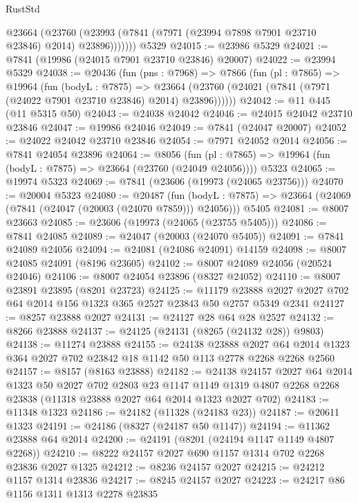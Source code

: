 \begin{lexlean}{RustStd}
\begin{coremodule}
{\begin{coremodule}
{{{{{{{{{{{{{{{{{{{{{{{{{{{{{{{{{{{{{{{{{{{{{{{{{{{{{{          @23664
            (@23760 (@23993 (@7841 (@7971 (@23994 @7898 @7901 @23710 @23846) @2014) @23896)))))))
    @5329
@24015 := @23986 @5329
@24021 := @7841 (@19986 (@24015 @7901 @23710 @23846) @20007)
@24022 := @23994 @5329
@24038 := @20436
    (fun (pns : @7968) =>
    @7866
      (fun (pl : @7865) =>
      @19964
        (fun (bodyL : @7875) =>
        @23664 (@23760 (@24021 (@7841 (@7971 (@24022 @7901 @23710 @23846) @2014) @23896))))))
@24042 := @11 @445 (@11 @5315 @50)
@24043 := @24038 @24042
@24046 := @24015 @24042 @23710 @23846
@24047 := @19986 @24046
@24049 := @7841 (@24047 @20007)
@24052 := @24022 @24042 @23710 @23846
@24054 := @7971 @24052 @2014
@24056 := @7841 @24054 @23896
@24064 := @8056
    (fun (pl : @7865) => @19964 (fun (bodyL : @7875) => @23664 (@23760 (@24049 @24056))))
    @5323
@24065 := @19974 @5323
@24069 := @7841 (@23606 (@19973 (@24065 @23756)))
@24070 := @20004 @5323
@24080 := @20487
    (fun (bodyL : @7875) => @23664 (@24069 (@7841 (@24047 (@20003 (@24070 @7859))) @24056)))
    @5405
@24081 := @8007 @23663
@24085 := @23606 (@19973 (@24065 (@23755 @5405)))
@24086 := @7841 @24085
@24089 := @24047 (@20003 (@24070 @5405))
@24091 := @7841 @24089 @24056
@24094 := @24081 (@24086 @24091) @14159
@24098 := @8007 @24085 @24091 (@8196 @23605)
@24102 := @8007 @24089 @24056 (@20524 @24046)
@24106 := @8007 @24054 @23896 (@8327 @24052)
@24110 := @8007 @23891 @23895 (@8201 @23723)
@24125 := @11179
    @23888
    @2027
    @2027
    @702
    @64
    @2014
    @156
    @1323
    @365
    @2527
    @23843
    @50
    @2757
    @5349
    @2341
@24127 := @8257 @23888 @2027
@24131 := @24127 @28 @64 @28 @2527
@24132 := @8266 @23888
@24137 := @24125 (@24131 (@8265 (@24132 @28)) @9803)
@24138 := @11274 @23888
@24155 := @24138
    @23888
    @2027
    @64
    @2014
    @1323
    @364
    @2027
    @702
    @23842
    @18
    @1142
    @50
    @113
    @2778
    @2268
    @2268
    @2560
@24157 := @8157 (@8163 @23888)
@24182 := @24138
    @24157
    @2027
    @64
    @2014
    @1323
    @50
    @2027
    @702
    @2803
    @23
    @1147
    @1149
    @1319
    @4807
    @2268
    @2268
    @23838
    (@11318 @23888 @2027 @64 @2014 @1323 @2027 @702)
@24183 := @11348 @1323
@24186 := @24182 (@11328 (@24183 @23))
@24187 := @20611 @1323
@24191 := @24186 (@8327 (@24187 @50 @1147))
@24194 := @11362 @23888 @64 @2014
@24200 := @24191 (@8201 (@24194 @1147 @1149 @4807 @2268))
@24210 := @8222 @24157 @2027 @690 @1157 @1314 @702 @2268 @23836 @2027 @1325
@24212 := @8236 @24157 @2027
@24215 := @24212 @1157 @1314 @23836
@24217 := @8245 @24157 @2027
@24223 := @24217 @86 @1156 @1311 @1313 @2278 @23835
}}}}}}}}}}}}}}}}}}}}}}}}}}}}}}}}}}}}}}}}}}}}}}}}}}}}}}
\end{coremodule}}
\end{coremodule}
\end{lexlean}
